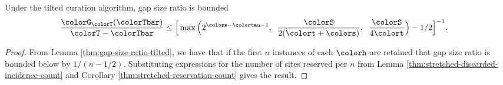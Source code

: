 \begin{theorem}
\label{thm:tilted-gap-size}
Under the tilted curation algorithm, gap size ratio is bounded
\begin{align*}
  \frac{\colorG_{\colorT}(\colorTbar)}{\colorT - \colorTbar}
  &\leq
  \Big[
    \max\Big(
      2^{\colors - \colortau - 1},\;\;
      \frac{\colorS}{2(\colort + \colors)},\;\;
      \frac{\colorS}{4\colort}
    \Big)
    - 1/2
  \Big]^{-1}.
\end{align*}
\end{theorem}
\begin{proof}

From Lemma \ref{thm:gap-size-ratio-tilted}, we have that if the first $n$ instances of each \hv{} $\colorh$ are retained that gap size ratio is bounded below by $1/(n - 1/2)$.
Substituting expressions for the number of sites reserved per \hv{} $n$ from Lemma \ref{thm:stretched-discarded-incidence-count} and Corollary \ref{thm:stretched-reservation-count} gives the result.
\end{proof}
